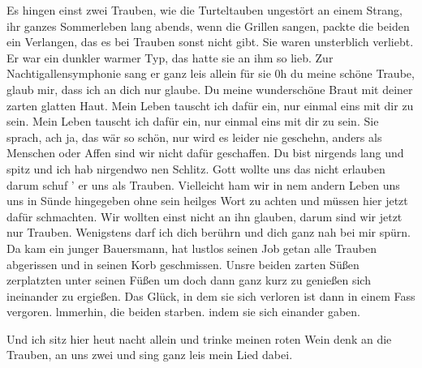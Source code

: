 

\beginverse
Es hingen einst zwei Trauben, wie die Turteltauben
ungestört an einem Strang, ihr ganzes Sommerleben lang
abends, wenn die Grillen sangen, packte die beiden ein Verlangen,
das es bei Trauben sonst nicht gibt. Sie waren unsterblich verliebt.
Er war ein dunkler warmer Typ, das hatte sie an ihm so lieb.
Zur Nachtigallensymphonie sang er ganz leis allein für sie
0h du meine schöne Traube, glaub mir, dass ich an dich nur glaube.
Du meine wunderschöne Braut mit deiner zarten glatten Haut.
\endverse
\beginchorus
Mein Leben tauscht ich dafür ein, nur einmal eins mit dir zu sein.
Mein Leben tauscht ich dafür ein, nur einmal eins mit dir zu sein.
\endchorus
\beginverse
Sie sprach, ach ja, das wär so schön, nur wird es leider nie geschehn,
anders als Menschen oder Affen sind wir nicht dafür geschaffen.
Du bist nirgends lang und spitz und ich hab nirgendwo nen Schlitz.
Gott wollte uns das nicht erlauben darum schuf ' er uns als Trauben.
Vielleicht ham wir in nem andern Leben uns uns in Sünde hingegeben
ohne sein heilges Wort zu achten und müssen hier jetzt dafür schmachten.
Wir wollten einst nicht an ihn glauben, darum sind wir jetzt nur Trauben.
Wenigstens darf ich dich berührn und dich ganz nah bei mir spürn.
\endverse{}
\beginverse
Da kam ein junger Bauersmann, hat lustlos seinen Job getan
alle Trauben abgerissen und in seinen Korb geschmissen.
Unsre beiden zarten Süßen zerplatzten unter seinen Füßen
um doch dann ganz kurz zu genießen sich ineinander zu ergießen.
Das Glück, in dem sie sich verloren ist dann in einem Fass vergoren.
lmmerhin, die beiden starben. indem sie sich einander gaben.

Und ich sitz hier heut nacht allein und trinke meinen roten Wein
denk an die Trauben, an uns zwei und sing ganz leis mein Lied dabei.
\endverse
{}
\endsong
